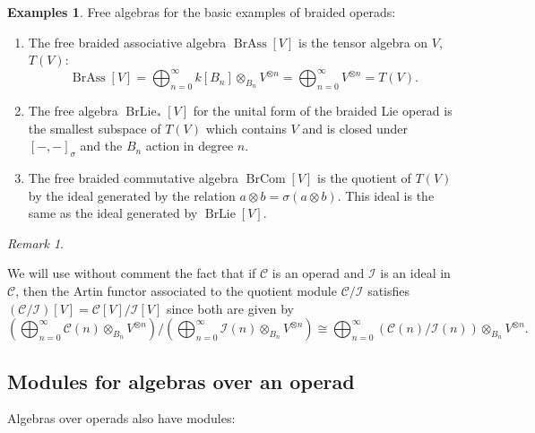 \documentclass[12pt]{article}
\DeclareMathOperator{\BrAss}{BrAss}
\DeclareMathOperator{\BrLie}{BrLie}
\DeclareMathOperator{\BrCom}{BrCom}
\newcommand{\CC} {\mathcal{C}}
\newcommand{\II}{\mathcal{I}}
\theoremstyle{plain}
\theoremstyle{definition}
\newtheorem{exmps}[thm]{Examples}
\theoremstyle{remark}
\newtheorem{rem}[thm]{Remark}
\begin{document}
\begin{exmps}
Free algebras for the basic examples of braided operads:
\begin{enumerate}

\item The free braided associative algebra $\BrAss[V]$ is the tensor algebra on $V$, $T(V)$:
%
$$\BrAss[V] = \bigoplus_{n=0}^\infty k[B_n] \otimes_{B_n} V^{\otimes n} = \bigoplus_{n=0}^\infty V^{\otimes n} = T(V).$$

\item The free algebra $\BrLie_*[V]$ for the unital form of the braided Lie operad is the smallest subspace of $T(V)$ which contains $V$ and is closed under $[-,-]_{\sigma}$ and the $B_n$ action in degree $n$. 

\item The free braided commutative algebra $\BrCom[V]$ is the quotient of $T(V)$ by the ideal generated by the relation $a \otimes b = \sigma(a \otimes b)$.  This ideal is the same as the ideal generated by $\BrLie[V]$.

\end{enumerate}
\end{exmps}

\begin{rem} \label{quot_note}

We will use without comment the fact that if $\CC$ is an operad and $\II$ is an ideal in $\CC$, then the Artin functor associated to the quotient module $\CC/\II$ satisfies $(\CC/\II)[V] = \CC[V]/\II[V]$ since both are given by 
%
$$\left(\bigoplus_{n=0}^\infty \CC(n) \otimes_{B_n} V^{\otimes n}\right)/\left(\bigoplus_{n=0}^\infty \II(n) \otimes_{B_n} V^{\otimes n}\right) \cong \bigoplus_{n=0}^\infty (\CC(n)/\II(n)) \otimes_{B_n} V^{\otimes n}.$$

\end{rem}

\subsection{Modules for algebras over an operad}

Algebras over operads also have modules: 
\end{document}
